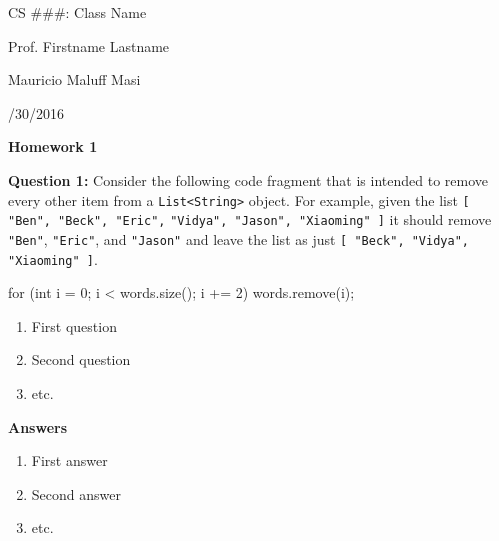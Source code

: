 \documentclass[letter,12pt]{article}
\newcommand{\code}{\texttt}
\begin{document}
\noindent CS \#\#\#: Class Name

\noindent Prof. Firstname Lastname

\noindent Mauricio Maluff Masi

/30/2016

{\centering
\large{\textbf{Homework 1}}

}
\vspace{12pt}
\noindent\textbf{Question 1:} Consider the following code fragment that is intended to remove every other item from a \code{List<String>} object. For example, given the list \code{[ "Ben", "Beck", "Eric",}
\code{"Vidya", "Jason", "Xiaoming" ]} it should remove \code{"Ben"}, \code{"Eric"}, and \code{"Jason"} and leave the list as just \code{[ "Beck", "Vidya", "Xiaoming" ]}.

\begin{javacode}
for (int i = 0; i < words.size(); i += 2) {
    words.remove(i); 
} 
\end{javacode}

\begin{enumerate}[label=\emph{\Alph*}.]
	\item First question
	\item Second question
	\item etc.
\end{enumerate}

\noindent\textbf{Answers}
\begin{enumerate}[label=\emph{\Alph*}.]
	\item First answer
	\item Second answer
	\item etc.
\end{enumerate}
\end{document}
